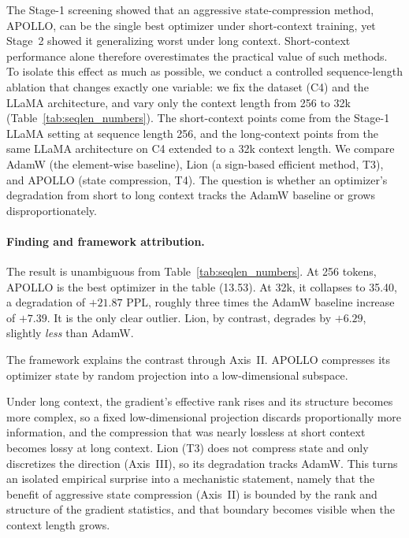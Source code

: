 The Stage-1 screening showed that an aggressive state-compression method,
APOLLO, can be the single best optimizer under short-context training, yet
Stage~2 showed it generalizing worst under long context. Short-context
performance alone therefore overestimates the practical value of such methods.
To isolate this effect as much as possible, we conduct a controlled
sequence-length ablation that changes exactly one variable: we fix the
dataset (C4) and the LLaMA architecture, and vary only the context length
from 256 to 32k (Table~\ref{tab:seqlen_numbers}). The short-context points
come from the Stage-1 LLaMA setting at sequence length 256, and the
long-context points from the same LLaMA architecture on C4 extended to a
32k context length. We compare AdamW (the element-wise baseline),
Lion (a sign-based efficient method, T3), and APOLLO (state compression, T4).
The question is whether an optimizer's degradation from short to long context
tracks the AdamW baseline or grows disproportionately.

\paragraph{Finding and framework attribution.}
The result is unambiguous from Table~\ref{tab:seqlen_numbers}. At 256 tokens, APOLLO is the best optimizer in the table (13.53). At 32k, it collapses to 35.40, a degradation of $+21.87$ PPL, roughly three times the AdamW baseline increase of $+7.39$. It is the only clear outlier. Lion, by contrast, degrades by $+6.29$, slightly \emph{less} than AdamW.

The framework explains the contrast through Axis~II. APOLLO compresses its optimizer state by random projection into a low-dimensional subspace.



Under long context, the gradient's effective rank rises and its structure becomes
more complex, so a fixed low-dimensional projection discards proportionally
more information, and the compression that was nearly lossless at short context
becomes lossy at long context. Lion (T3) does not compress state and only
discretizes the direction (Axis~III), so its degradation tracks AdamW. This turns an isolated
empirical surprise into a mechanistic statement, namely that the benefit of aggressive
state compression (Axis~II) is bounded by the rank and structure of the
gradient statistics, and that boundary becomes visible when the context length
grows.

